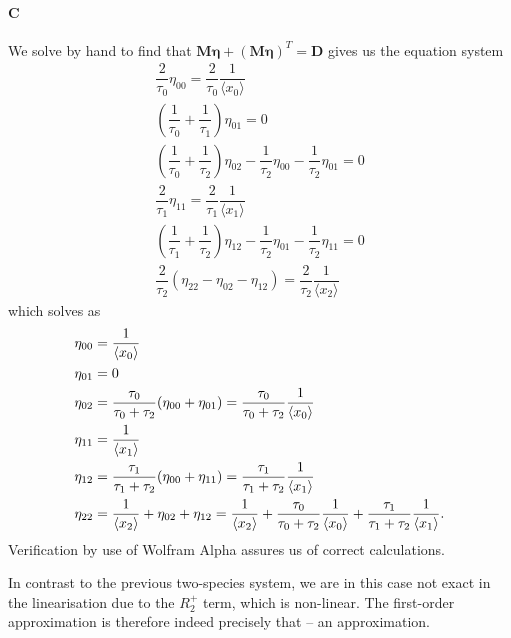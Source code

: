 \documentclass[10pt]{article}\usepackage[]{graphicx}\usepackage[]{color}
\newcommand{\matr}[1]{\mathbf{#1}}
\newcommand{\avg}[1]{\ensuremath{\langle {#1} \rangle}} %
\theoremstyle{plain}
\begin{document}
  \paragraph*{C}
  We solve by hand to find that $\matr M \matr \eta + (\matr M \matr \eta)^T = \matr D$ gives us the equation system
  \begin{gather*}
      \dfrac{2}{\tau_0}\eta_{00}  = \dfrac{2}{\tau_0} \dfrac{1}{\avg{x_0}} \\
      \left(\dfrac{1}{\tau_0} + \dfrac{1}{\tau_1}\right)\eta_{01} = 0 \\
      \left(\dfrac{1}{\tau_0} + \dfrac{1}{\tau_2}\right)\eta_{02} - \dfrac{1}{\tau_2}\eta_{00} - \dfrac{1}{\tau_2}\eta_{01} = 0 \\
      \dfrac{2}{\tau_1}\eta_{11} = \dfrac{2}{\tau_1} \dfrac{1}{\avg{x_1}} \\
      \left(\dfrac{1}{\tau_1} + \dfrac{1}{\tau_2}\right)\eta_{12} - \dfrac{1}{\tau_2}\eta_{01} - \dfrac{1}{\tau_2}\eta_{11} = 0 \\
      \dfrac{2}{\tau_2}(\eta_{22} - \eta_{02} - \eta_{12})  = \dfrac{2}{\tau_2} \dfrac{1}{\avg{x_2}}     
    \end{gather*}
    which solves as
    \begin{gather*}
  \begin{align*}
  \centering
  \eta_{00} &= \dfrac{1}{\avg{x_0}} \\ 
  \eta_{01} &= 0 \\ 
  \eta_{02} &= \dfrac{\tau_0}{\tau_0 + \tau_2} (\eta_{00} + \eta_{01})  = \dfrac{\tau_0}{\tau_0 + \tau_2} \dfrac{1}{\avg{x_0}} \\ 
  \eta_{11} &= \dfrac{1}{\avg{x_1}} \\ 
  \eta_{12} &= \dfrac{\tau_1}{\tau_1 + \tau_2} (\eta_{00} + \eta_{11}) = \dfrac{\tau_1}{\tau_1 + \tau_2} \dfrac{1}{\avg{x_1}} \\ 
  \eta_{22} &= \dfrac{1}{\avg{x_2}} + \eta_{02} + \eta_{12} = \dfrac{1}{\avg{x_2}} + \dfrac{\tau_0}{\tau_0 + \tau_2}\dfrac{1}{\avg{x_0}} + \dfrac{\tau_1}{\tau_1 + \tau_2}\dfrac{1}{\avg{x_1}}.
  \end{align*}
  \end{gather*}
  Verification by use of Wolfram Alpha assures us of correct calculations.
  
  In contrast to the previous two-species system, we are in this case not exact in the linearisation due to the $R_2^+$ term, which is non-linear. The first-order approximation is therefore indeed precisely that -- an approximation. 
  
\end{document}
